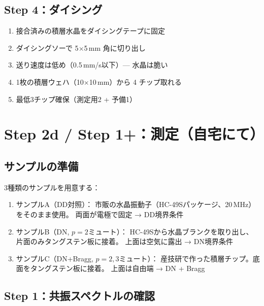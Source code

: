 \documentclass[11pt,a4paper]{article}
\def\textbf#1{#1}%
\begin{document}
\subsection{Step 4：ダイシング}

\begin{enumerate}[leftmargin=*]
\item 接合済みの積層水晶をダイシングテープに固定
\item ダイシングソーで 5$\times$5\,mm 角に切り出し
\item 送り速度は低め（0.5\,mm/s以下）— 水晶は脆い
\item 1枚の積層ウェハ（10$\times$10\,mm）から 4 チップ取れる
\item 最低3チップ確保（測定用2 + 予備1）
\end{enumerate}


\section{Step 2d / Step 1+：測定（自宅にて）}

\subsection{サンプルの準備}

3種類のサンプルを用意する：

\begin{enumerate}[leftmargin=*]
\item \textbf{サンプルA（DD対照）}：
  市販の水晶振動子（HC-49Sパッケージ、20\,MHz）をそのまま使用。
  両面が電極で固定 → DD境界条件
\item \textbf{サンプルB（DN, $p=2$ミュート）}：
  HC-49Sから水晶ブランクを取り出し、片面のみタングステン板に接着。
  上面は空気に露出 → DN境界条件
\item \textbf{サンプルC（DN+Bragg, $p=2,3$ミュート）}：
  産技研で作った積層チップ。底面をタングステン板に接着。
  上面は自由端 → DN + Bragg
\end{enumerate}

\subsection{Step 1：共振スペクトルの確認}
\end{document}
